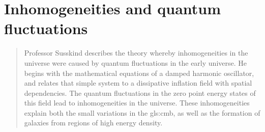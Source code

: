 \documentclass[]{article}
\begin{document}
\section{Inhomogeneities and quantum fluctuations}

\begin{quotation}
Professor Susskind describes the theory whereby inhomogeneities in the universe were caused by quantum fluctuations in the early universe.  He begins with the mathematical equations of a damped harmonic oscillator, and relates that simple system to a dissipative inflation field with spatial dependencies.  The quantum fluctuations in the zero point energy states of this field lead to inhomogeneities in the universe.  These inhomogeneities explain both the small variations in the \gls{gls:cmb}, as well as the formation of galaxies from regions of high energy density.
\end{quotation}


\printglossaries


\raggedright

\end{document}

